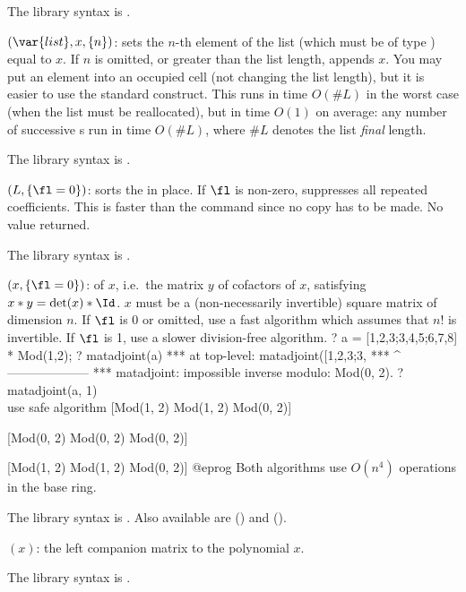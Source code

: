The library syntax is .

$(\var{list},x,\{n\})$: \label{se:listput}
sets the $n$-th element of the list
 (which must be of type ) equal to $x$. If $n$ is omitted,
or greater than the list length, appends $x$.
You may put an element into an occupied cell (not changing the
list length), but it is easier to use the standard 
construct. This runs in time $O(\#L)$ in the worst case (when the list must
be reallocated), but in time $O(1)$ on average: any number of successive
s run in time $O(\#L)$, where $\#L$ denotes the list
\emph{final} length.

The library syntax is .

$(L,\{\fl=0\})$: \label{se:listsort}sorts the   in place. If $\fl$ is non-zero,
suppresses all repeated coefficients. This is faster than the 
command since no copy has to be made. No value returned.

The library syntax is .

$(x,\{\fl=0\})$: \label{se:matadjoint}
 of $x$, i.e.~the matrix $y$
of cofactors of $x$, satisfying $x*y=\det(x)*\Id$. $x$ must be a
(non-necessarily invertible) square matrix of dimension $n$.
If $\fl$ is 0 or omitted, use a fast algorithm which assumes that $n!$ is
invertible. If $\fl$ is 1, use a slower division-free algorithm.
\bprog
? a = [1,2,3;3,4,5;6,7,8] * Mod(1,2);
? matadjoint(a)
 ***   at top-level: matadjoint([1,2,3;3,
 ***                 ^--------------------
 *** matadjoint: impossible inverse modulo: Mod(0, 2).
? matadjoint(a, 1)  \\ use safe algorithm
[Mod(1, 2) Mod(1, 2) Mod(0, 2)]

[Mod(0, 2) Mod(0, 2) Mod(0, 2)]

[Mod(1, 2) Mod(1, 2) Mod(0, 2)]
@eprog\noindent
Both algorithms use $O(n^4)$ operations in the base ring.

The library syntax is .
Also available are
 () and
 ().

$(x)$: \label{se:matcompanion}
the left companion matrix to the polynomial $x$.

The library syntax is .

